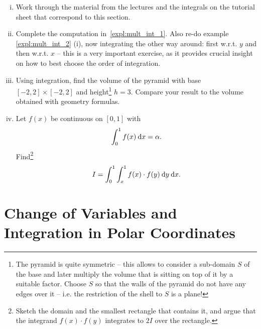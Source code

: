\begin{exercise}
\begin{enumerate}[(i)]
	\item Work through the material from the lectures and the integrals on the tutorial sheet that correspond to this section.
	\item Complete the computation in~\ref{expl:mult_int_1}. Also re-do example \ref{expl:mult_int_2} (i), now integrating the other way around: first w.r.t. $y$ and then w.r.t. $x$ -- this is a very important exercise, as it provides crucial insight on how to best choose the order of integration.
	\item Using integration, find the volume of the pyramid with base $[-2,2]\times[-2,2]$ and height\footnote{The pyramid is quite symmetric -- this allows to consider a sub-domain $S$ of the base and later multiply the volume that is sitting on top of it by a suitable factor. Choose $S$ so that the walls of the pyramid do not have any edges over it -- i.e. the restriction of the shell to $S$ is a plane!} $h=3$. Compare your result to the volume obtained with geometry formulas.
	\item Let $f(x)$ be continuous on $[0,1]$ with
	\[ \int_{0}^{1} f(x) \: \mathrm{d} x = \alpha. \]
	Find\footnote{Sketch the domain and the smallest rectangle that contains it, and argue that the integrand $f(x) \cdot f(y)$ integrates to $2I$ over the rectangle.}
	\[ I = \int_{0}^{1} \int_{x}^{1} f(x) \cdot f(y) \: \mathrm{d} y \: \mathrm{d} x. \]
\end{enumerate}
\end{exercise}

\section{Change of Variables and Integration in Polar Coordinates}

